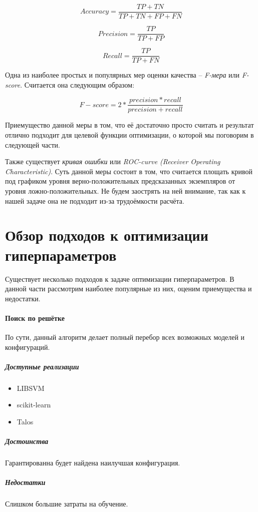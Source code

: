 \documentclass[times,specification,annotation]{itmo-student-thesis}
\begin{document}
	\begin{equation}
	Accuracy = \frac{TP+TN}{TP+TN+FP+FN} 
	\label{eq:accuracy}
	\end{equation}
	
	\begin{equation} 
	Precision = \frac{TP}{TP+FP} 
	\label{eq:precision}
	\end{equation}
	
	\begin{equation}
	Recall =  \frac{TP}{TP+FN}
	\label{eq:recall}
	\end{equation}
	
	Одна из наиболее простых и популярных мер оценки качества -- \textit{F-мера} или \textit{F-score}\cite{powers2015fmeasure}. Считается она следующим образом:
	
	\begin{equation}
 	\mathit{F-score} =  2 * \frac{precision*recall}{precision+recall} 
 	\label{eq:fscore}
	\end{equation}
		
	Приемущество данной меры в том, что её достаточно просто считать и результат отлично подходит для целевой функции оптимизации, о которой мы поговорим в следующей части.\par
	
	Также существует \textit{кривая ошибки} или \textit{ROC-curve (Receiver Operating Characteristic)}. Суть данной меры состоит в том, что считается площать кривой под графиком уровня верно-положительных предсказанных экземпляров от уровня ложно-положительных. Не будем заострять на ней внимание, так как к нашей задаче она не подходит из-за трудоёмкости расчёта. 
	
	
	\section{Обзор подходов к оптимизации гиперпараметров}
	Существует несколько подходов к задаче оптимизации гиперпараметров. В данной части рассмотрим наиболее популярные из них, оценим приемущества и недостатки.
	\paragraph{Поиск по решётке} По сути, данный алгоритм делает полный перебор всех возможных моделей и конфигураций.
		\subparagraph{Доступные реализации}
		\begin{itemize}
			\item LIBSVM
			\item scikit-learn
			\item Talos
		\end{itemize}
		\subparagraph{Достоинства} Гарантированна будет найдена наилучшая конфигурация.
		\subparagraph{Недостатки} Слишком большие затраты на обучение.
\end{document}
